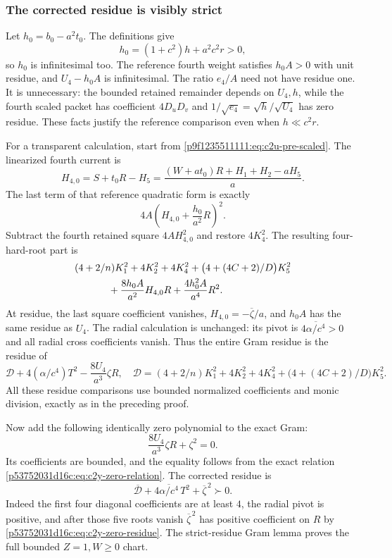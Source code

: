\subsubsection*{The corrected residue is visibly strict}
Let $h_0=b_0-a^2t_0$.  The definitions give
\begin{equation}
h_0=(1+c^2)h+a^2c^2r>0,
\label{p53752031d16c:eq:c2y-h0}
\end{equation}
so $h_0$ is infinitesimal too.  The reference fourth weight satisfies
$h_0A>0$ with unit residue, and $U_4-h_0A$ is infinitesimal.
The ratio $e_4/A$ need not have residue one.  It is unnecessary:
the bounded retained remainder depends on $U_4,h$, while the fourth
scaled packet has coefficient $4D_uD_v$ and
$1/\sqrt{e_4}=\sqrt h/\sqrt{U_4}$ has zero residue.  These facts
justify the reference comparison even when $h\ll c^2r$.

For a transparent calculation, start from
\eqref{p9f1235511111:eq:c2u-pre-scaled}.  The linearized fourth current is
\[
H_{4,0}=S+t_0R-H_5
=\frac{(W+at_0)R+H_1+H_2-aH_5}{a}.
\]
The last term of that reference quadratic form is exactly
\[
4A\left(H_{4,0}+\frac{h_0}{a^2}R\right)^2.
\]
Subtract the fourth retained square $4AH_{4,0}^2$ and restore
$4K_4^2$.  The resulting four-hard-root part is
\[
\begin{split}
&(4+2/n)K_1^2+4K_2^2+4K_4^2
 +\bigl(4+(4C+2)/D\bigr)K_5^2\\
&\hspace{12mm}+\frac{8h_0A}{a^2}H_{4,0}R
 +\frac{4h_0^2A}{a^4}R^2.
\end{split}
\]
At residue, the last square coefficient vanishes,
$H_{4,0}=-\overline\zeta/a$, and $h_0A$ has the same residue as $U_4$.
The radial calculation is unchanged: its pivot is
$4\overline{\alpha/c^4}>0$ and all radial cross coefficients vanish.
Thus the entire Gram residue is the residue of
\begin{equation}
\mathcal D+4(\alpha/c^4)T^2-\frac{8U_4}{a^3}\zeta R,
\quad
\mathcal D=(4+2/n)K_1^2+4K_2^2+4K_4^2
+\bigl(4+(4C+2)/D\bigr)K_5^2.
\label{p53752031d16c:eq:c2y-uncorrected}
\end{equation}
All these residue comparisons use bounded normalized coefficients and
monic division, exactly as in the preceding proof.

Now add the following identically zero polynomial to the exact Gram:
\begin{equation}
\frac{8U_4}{a^3}\zeta R+\zeta^2=0.
\label{p53752031d16c:eq:c2y-zero-correction}
\end{equation}
Its coefficients are bounded, and the equality follows from the exact
relation \eqref{p53752031d16c:eq:c2y-zero-relation}.  The corrected residue is
\[
\overline{\mathcal D}
+4\overline{\alpha/c^4}\,T^2+\overline\zeta^{\,2}\succ0.
\]
Indeed the first four diagonal coefficients are at least $4$, the radial
pivot is positive, and after those five roots vanish
$\overline\zeta^{\,2}$ has positive coefficient on $R$ by
\eqref{p53752031d16c:eq:c2y-zero-residue}.  The strict-residue Gram lemma proves the
full bounded $Z=1,W\geq0$ chart.

